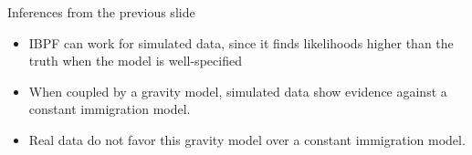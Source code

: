 \documentclass{beamer}
\begin{document}
\begin{frame}{Inferences from the previous slide}

  \begin{itemize}
  \item
IBPF can work for simulated data, since it finds likelihoods higher than the truth when the model is well-specified

  \vspace{5mm}

  \item
    When coupled by a gravity model, simulated data show evidence against a constant immigration model.

    \vspace{5mm}
    
  \item 
    Real data do not favor this gravity model over a constant immigration model.
\end{itemize}

\end{frame}
\end{document}
